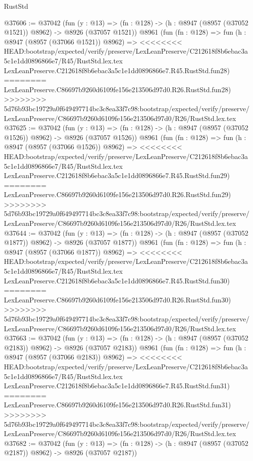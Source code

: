 \begin{lexlean}{RustStd}
\begin{coremodule}
{\begin{coremodule}
{{{{{{{{{{{{{{{{{{{{{{{{{{{{{{{{{{{{{{{@37606 := @37042
    (fun (y : @13) =>
    (fn : @128) -> (h : @8947 (@8957 (@37052 @1521)) @8962) -> @8926 (@37057 @1521))
    @8961
    (fun (fn : @128) =>
    fun (h : @8947 (@8957 (@37066 @1521)) @8962) =>
<<<<<<<< HEAD:bootstrap/expected/verify/preserve/LexLeanPreserve/C212618f8b6ebac3a5c1e1dd0896866e7/R45/RustStd.lex.tex
    LexLeanPreserve.C212618f8b6ebac3a5c1e1dd0896866e7.R45.RustStd.fun28)
========
    LexLeanPreserve.C86697b9260d6109fe156e213506d97d0.R26.RustStd.fun28)
>>>>>>>> 5d76b93bc19729a0f649497714bc3c8ea33f7c98:bootstrap/expected/verify/preserve/LexLeanPreserve/C86697b9260d6109fe156e213506d97d0/R26/RustStd.lex.tex
@37625 := @37042
    (fun (y : @13) =>
    (fn : @128) -> (h : @8947 (@8957 (@37052 @1526)) @8962) -> @8926 (@37057 @1526))
    @8961
    (fun (fn : @128) =>
    fun (h : @8947 (@8957 (@37066 @1526)) @8962) =>
<<<<<<<< HEAD:bootstrap/expected/verify/preserve/LexLeanPreserve/C212618f8b6ebac3a5c1e1dd0896866e7/R45/RustStd.lex.tex
    LexLeanPreserve.C212618f8b6ebac3a5c1e1dd0896866e7.R45.RustStd.fun29)
========
    LexLeanPreserve.C86697b9260d6109fe156e213506d97d0.R26.RustStd.fun29)
>>>>>>>> 5d76b93bc19729a0f649497714bc3c8ea33f7c98:bootstrap/expected/verify/preserve/LexLeanPreserve/C86697b9260d6109fe156e213506d97d0/R26/RustStd.lex.tex
@37644 := @37042
    (fun (y : @13) =>
    (fn : @128) -> (h : @8947 (@8957 (@37052 @1877)) @8962) -> @8926 (@37057 @1877))
    @8961
    (fun (fn : @128) =>
    fun (h : @8947 (@8957 (@37066 @1877)) @8962) =>
<<<<<<<< HEAD:bootstrap/expected/verify/preserve/LexLeanPreserve/C212618f8b6ebac3a5c1e1dd0896866e7/R45/RustStd.lex.tex
    LexLeanPreserve.C212618f8b6ebac3a5c1e1dd0896866e7.R45.RustStd.fun30)
========
    LexLeanPreserve.C86697b9260d6109fe156e213506d97d0.R26.RustStd.fun30)
>>>>>>>> 5d76b93bc19729a0f649497714bc3c8ea33f7c98:bootstrap/expected/verify/preserve/LexLeanPreserve/C86697b9260d6109fe156e213506d97d0/R26/RustStd.lex.tex
@37663 := @37042
    (fun (y : @13) =>
    (fn : @128) -> (h : @8947 (@8957 (@37052 @2183)) @8962) -> @8926 (@37057 @2183))
    @8961
    (fun (fn : @128) =>
    fun (h : @8947 (@8957 (@37066 @2183)) @8962) =>
<<<<<<<< HEAD:bootstrap/expected/verify/preserve/LexLeanPreserve/C212618f8b6ebac3a5c1e1dd0896866e7/R45/RustStd.lex.tex
    LexLeanPreserve.C212618f8b6ebac3a5c1e1dd0896866e7.R45.RustStd.fun31)
========
    LexLeanPreserve.C86697b9260d6109fe156e213506d97d0.R26.RustStd.fun31)
>>>>>>>> 5d76b93bc19729a0f649497714bc3c8ea33f7c98:bootstrap/expected/verify/preserve/LexLeanPreserve/C86697b9260d6109fe156e213506d97d0/R26/RustStd.lex.tex
@37682 := @37042
    (fun (y : @13) =>
    (fn : @128) -> (h : @8947 (@8957 (@37052 @2187)) @8962) -> @8926 (@37057 @2187))
}}}}}}}}}}}}}}}}}}}}}}}}}}}}}}}}}}}}}}}
\end{coremodule}}
\end{coremodule}
\end{lexlean}
